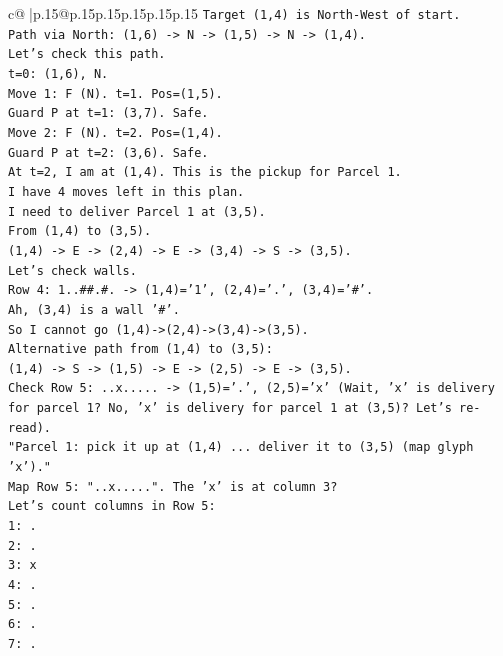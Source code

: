 \documentclass{article}
\begin{document}
{\begin{supertabular}{c@{$\;$}|p{.15\linewidth}@{}p{.15\linewidth}p{.15\linewidth}p{.15\linewidth}p{.15\linewidth}p{.15\linewidth}}
{{{\texttt{Target (1,4) is North{-}West of start.} \\
\texttt{Path via North: (1,6) {-}> N {-}> (1,5) {-}> N {-}> (1,4).} \\
\texttt{Let's check this path.} \\
\texttt{t=0: (1,6), N.} \\
\texttt{Move 1: F (N). t=1. Pos=(1,5).} \\
\texttt{Guard P at t=1: (3,7). Safe.} \\
\texttt{Move 2: F (N). t=2. Pos=(1,4).} \\
\texttt{Guard P at t=2: (3,6). Safe.} \\
\texttt{At t=2, I am at (1,4). This is the pickup for Parcel 1.} \\
\texttt{I have 4 moves left in this plan.} \\
\texttt{I need to deliver Parcel 1 at (3,5).} \\
\texttt{From (1,4) to (3,5).} \\
\texttt{(1,4) {-}> E {-}> (2,4) {-}> E {-}> (3,4) {-}> S {-}> (3,5).} \\
\texttt{Let's check walls.} \\
\texttt{Row 4: 1..\#\#.\#. {-}> (1,4)='1', (2,4)='.', (3,4)='\#'.} \\
\texttt{Ah, (3,4) is a wall '\#'.} \\
\texttt{So I cannot go (1,4){-}>(2,4){-}>(3,4){-}>(3,5).} \\
\texttt{Alternative path from (1,4) to (3,5):} \\
\texttt{(1,4) {-}> S {-}> (1,5) {-}> E {-}> (2,5) {-}> E {-}> (3,5).} \\
\texttt{Check Row 5: ..x..... {-}> (1,5)='.', (2,5)='x' (Wait, 'x' is delivery for parcel 1? No, 'x' is delivery for parcel 1 at (3,5)? Let's re{-}read).} \\
\texttt{"Parcel 1: pick it up at (1,4) ... deliver it to (3,5) (map glyph 'x')."} \\
\texttt{Map Row 5: "..x.....". The 'x' is at column 3?} \\
\texttt{Let's count columns in Row 5:} \\
\texttt{1: .} \\
\texttt{2: .} \\
\texttt{3: x} \\
\texttt{4: .} \\
\texttt{5: .} \\
\texttt{6: .} \\
\texttt{7: .} \\
}}}
\end{supertabular}}
\end{document}
